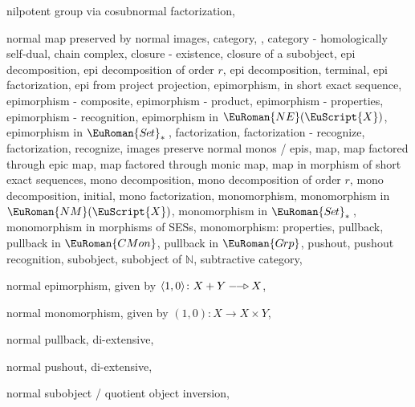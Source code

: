 \documentclass [12pt,oneside]{book}%
\theoremstyle{captionstyle}  %
\newcommand{\from}{\colon}				%
\newcommand{\IdMap}{1}												%
\newcommand{\NEpi}{-\hspace{-0.8ex}-\hspace{-0.7ex}\triangleright}	%
\newcommand{\NNr}{\mathbb{N}}		%
\newcommand{\SetsBsd}{\EuRoman{S{\kern-0.12ex}e{\hskip-0.14ex}t}_{\ast}\,}	%
\newcommand{\CMon}{\ensuremath{\EuRoman{CMon}}}
\newcommand{\Grps}{\EuRoman{G{\kern -.15ex}rp}}				%
\newcommand{\ZeroMap}{0}                                %
\newcommand{\Ctgry}[1]{\EuScript{#1}}					%
\newcommand{\NMonoCat}[1]{\EuRoman{NM}(\Ctgry{#1})}				%
\newcommand{\NEpiCat}[1]{\EuRoman{NE}(\Ctgry{#1})}				%
\newcommand{\Prdct}[2]{#1 \times #2}	 	%
\newcommand{\PrdctMapInto}[1]{( #1)}			%
\newcommand{\SumMapOutOf}[1]{\langle #1\rangle}     %
\begin{document}
\begin{theindex}
    \indexspace

    \item nilpotent
    \subitem group via cosubnormal factorization, 
    \item normal
    \subitem  map preserved by normal images, 
    \subitem category, , 
    \subitem category - homologically self-dual, 
    \subitem chain complex, 
    \subitem closure - existence, 
    \subitem closure of a subobject, 
    \subitem epi decomposition, 
    \subitem epi decomposition of order $r$, 
    \subitem epi decomposition, terminal, 
    \subitem epi factorization, 
    \subitem epi from project projection, 
    \subitem epimorphism, 
    \subsubitem in short exact sequence, 
    \subitem epimorphism - composite, 
    \subitem epimorphism - product, 
    \subitem epimorphism - properties, 
    \subitem epimorphism - recognition, 
    \subitem epimorphism in $\NEpiCat {X}$, 
    \subitem epimorphism in $\SetsBsd $, 
    \subitem factorization, 
    \subitem factorization - recognize, 
    \subitem factorization, recognize, 
    \subitem images preserve normal monos / epis, 
    \subitem map, 
    \subitem map factored through epic map, 
    \subitem map factored through monic map, 
    \subitem map in morphism of short exact sequences, 
    \subitem mono decomposition, 
    \subitem mono decomposition of order $r$, 
    \subitem mono decomposition, initial, 
    \subitem mono factorization, 
    \subitem monomorphism, 
    \subitem monomorphism in $\NMonoCat {X}$, 
    \subitem monomorphism in $\SetsBsd $, 
    \subitem monomorphism in morphisms of SESs, 
    \subitem monomorphism: properties, 
    \subitem pullback, 
    \subitem pullback in $\CMon $, 
    \subitem pullback in $\Grps $, 
    \subitem pushout, 
    \subitem pushout recognition, 
    \subitem subobject, 
    \subitem subobject of $\NNr $, 
    \subitem subtractive category, 
    \item normal epimorphism, 
    \subitem given by $\SumMapOutOf {\IdMap ,\ZeroMap }\from X+Y\NEpi X$,
    \item normal monomorphism, 
    \subitem given by $\PrdctMapInto {\IdMap ,\ZeroMap }\from X\to \Prdct {X}{Y}$,
    \item normal pullback, 
    \subitem di-extensive, 
    \item normal pushout, 
    \subitem di-extensive, 
    \item normal subobject / quotient object inversion, 


\end{theindex}
\end{document}
